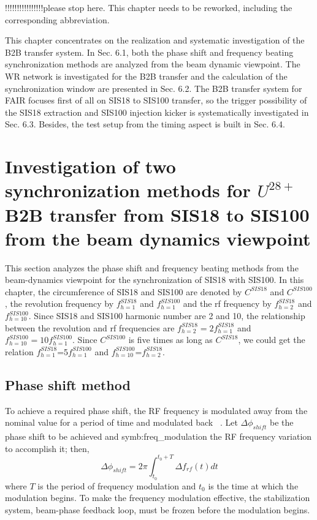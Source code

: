 !!!!!!!!!!!!!!!!please stop here. This chapter needs to be reworked, including the corresponding abbreviation.

This chapter concentrates on the realization and systematic investigation of the \gls{B2B} transfer system. In Sec. 6.1, both the phase shift and frequency beating synchronization methods are analyzed from the beam dynamic viewpoint. The WR network is investigated for the B2B transfer and the calculation of the synchronization window are presented in Sec. 6.2. The B2B transfer system for FAIR focuses first of all on SIS18 to SIS100 transfer, so the trigger possibility of the SIS18 extraction and SIS100 injection kicker is systematically investigated in Sec. 6.3. Besides, the test setup from the timing aspect is built in Sec. 6.4. 

\section{Investigation of two synchronization methods for $U^{28+}$ B2B transfer from SIS18 to SIS100 from the beam dynamics viewpoint }
This section analyzes the phase shift and frequency beating methods from the beam-dynamics viewpoint for the synchronization of SIS18 with SIS100. In this chapter, the circumference of SIS18 and SIS100 are denoted by $C^{SIS18}$ and $C^{SIS100}$, the revolution frequency by $f_{h=1}^{SIS18}$ and $f_{h=1}^{SIS100}$ and the rf frequency by $f_{h=2}^{SIS18}$ and $f_{h=10}^{SIS100}$. Since SIS18 and SIS100 harmonic number are 2 and 10, the relationship between the revolution and rf frequencies are $f_{h=2}^{SIS18}=2f_{h=1}^{SIS18}$ and $f_{h=10}^{SIS100}=10f_{h=1}^{SIS100}$. Since $C^{SIS100}$ is five times as long as $C^{SIS18}$, we could get the relation  $f_{h=1}^{SIS18}$=5$f_{h=1}^{SIS100}$ and $f_{h=10}^{SIS100}$=$f_{h=2}^{SIS18}$.
\subsection{Phase shift method}
To achieve a required phase shift, the \gls{RF} frequency is modulated away from the nominal value for a period of time and modulated back ~\cite{ezura_beam-dynamics_2008}. Let $\Delta \phi_\mathit{shift}$ be the phase shift to be achieved and \gls{symb:freq_modulation} the RF frequency variation to accomplish it; then,
\begin{equation}
\Delta \phi_{shift}= 2\pi \int_{t_0}^{t_0+T} \Delta f_{rf}(t)dt \label{phase_integration}
\end{equation}
where $T$ is the period of frequency modulation and $t_0$ is the time at which the modulation begins. To make the frequency modulation effective, the stabilization system, beam-phase feedback loop, must be frozen before the modulation begins. 

